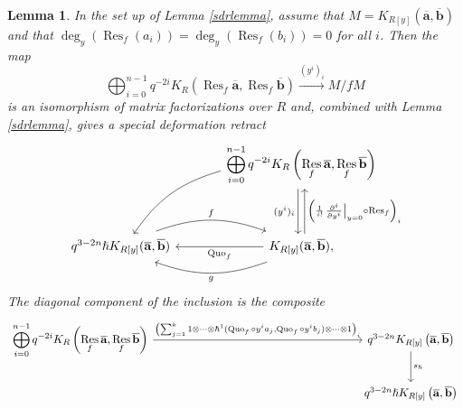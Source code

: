 \documentclass{article}
\DeclareMathOperator{\Res}{Res}
\DeclareMathOperator{\Quo}{Quo}
\theoremstyle{plain} %
\newtheorem{lemma}[theorem]{Lemma}
\theoremstyle{definition} %
\theoremstyle{remark} %
\begin{document}
\begin{lemma}\label{lemma:sdrkoszul}
    In the set up of Lemma \ref{sdrlemma}, assume that $M=K_{R[y]}(\mathbf{\overline a},\mathbf{\overline b})$ and that $\deg_y(\Res_f(a_i))=\deg_y(\Res_f(b_i))=0$ for all $i$. Then the map
    $$\bigoplus_{i=0}^{n -1} q^{-2i}K_{R}\left(\Res_f\mathbf{\overline a},\Res_f\mathbf{\overline b}\right)\xrightarrow{(y^i)_i}M/fM$$ is an isomorphism of matrix factorizations over $R$ and, combined with Lemma \ref{sdrlemma}, gives a special deformation retract
     $$\begin{tikzcd}[column sep=large, ]
    &\displaystyle\bigoplus_{i=0}^{n -1} q^{-2i}K_{R}\left(\Res_f\mathbf{\overline a},\Res_f\mathbf{\overline b}\right)\ar[dd, shift right=0.6ex, "(y^i)_i", swap]\ar[dd, leftarrow, shift left=0.6ex, "\left(\frac{1}{i!}\left.\frac{\partial^i}{\partial y^i}\right|_{y=0}\circ \Res_f\right)_i"]\arrow[ddl, "{}", bend right=20, swap]\\\\
    q^{3-2n}\hslash K_{R[y]}(\mathbf{\overline a},\mathbf{\overline b})\arrow[r, "f", shift left=0.5ex, bend left=20]& K_{R[y]}(\mathbf{\overline a},\mathbf{\overline b})\ar[l, "\Quo_f"]\arrow[l, "g", shift left=0.5ex, bend left=20], 
\end{tikzcd}$$
The diagonal component of the inclusion is the composite
$$
\begin{tikzcd}
    \displaystyle\bigoplus_{i=0}^{n-1}q^{-2i}K_{R}\left(\Res_f\mathbf{\overline a},\Res_f\mathbf{\overline b}\right) \arrow[r, "{\left(\sum_{j=1}^k1\otimes\cdots \otimes\hslash^1(\Quo_f\circ y^i a_j,\Quo_f\circ y^i b_j)\otimes\cdots\otimes 1\right)_i}"] &[5.5cm] q^{3-2n}K_{R[y]}\left(\mathbf{\overline a},\mathbf{\overline b}\right) \arrow[d,"s_\hslash"] \\& q^{3-2n}\hslash K_{R[y]}\left(\mathbf{\overline a},\mathbf{\overline b}\right)
\end{tikzcd}
$$
\end{lemma}



% 
\end{document}
